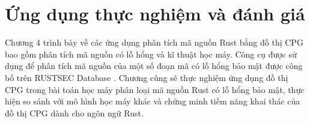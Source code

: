 \chapter{Ứng dụng thực nghiệm và đánh giá}
\label{chap:experiment}


Chương 4 trình bày về các ứng dụng phân tích mã nguồn Rust bằng đồ thị CPG bao gồm phân tích mã nguồn có lỗ hổng và kĩ thuật học máy.
Công cụ được sử dụng để phân tích mã nguồn của một số đoạn mã có lỗ hổng bảo mật được công bố trên RUSTSEC Database \cite{rustsecAboutRustSec}.
Chương cũng sẽ thực nghiệm ứng dụng đồ thị CPG trong bài toán học máy phân loại mã nguồn Rust có lỗ hổng bảo mật, thực hiện so sánh với mô hình học máy khác và chứng minh tiềm năng khai thác của đồ thị CPG dành cho ngôn ngữ Rust.

% 
% 
% 



